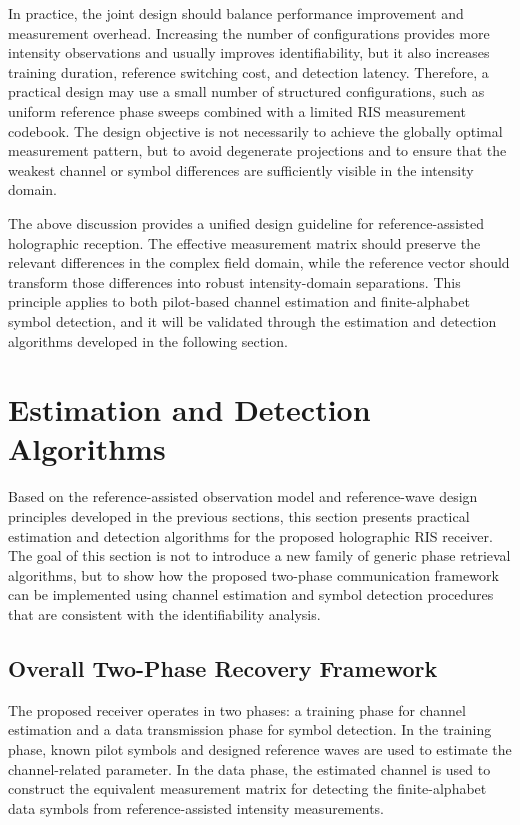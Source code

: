 \documentclass[journal]{IEEEtran}
\begin{document}
In practice, the joint design should balance performance improvement and measurement overhead. 
Increasing the number of configurations provides more intensity observations and usually improves identifiability, but it also increases training duration, reference switching cost, and detection latency. 
Therefore, a practical design may use a small number of structured configurations, such as uniform reference phase sweeps combined with a limited RIS measurement codebook. 
The design objective is not necessarily to achieve the globally optimal measurement pattern, but to avoid degenerate projections and to ensure that the weakest channel or symbol differences are sufficiently visible in the intensity domain.

The above discussion provides a unified design guideline for reference-assisted holographic reception. 
The effective measurement matrix should preserve the relevant differences in the complex field domain, while the reference vector should transform those differences into robust intensity-domain separations. 
This principle applies to both pilot-based channel estimation and finite-alphabet symbol detection, and it will be validated through the estimation and detection algorithms developed in the following section.

\section{Estimation and Detection Algorithms}

Based on the reference-assisted observation model and reference-wave design principles developed in the previous sections, this section presents practical estimation and detection algorithms for the proposed holographic RIS receiver. 
The goal of this section is not to introduce a new family of generic phase retrieval algorithms, but to show how the proposed two-phase communication framework can be implemented using channel estimation and symbol detection procedures that are consistent with the identifiability analysis.

\subsection{Overall Two-Phase Recovery Framework}

The proposed receiver operates in two phases: a training phase for channel estimation and a data transmission phase for symbol detection. 
In the training phase, known pilot symbols and designed reference waves are used to estimate the channel-related parameter. 
In the data phase, the estimated channel is used to construct the equivalent measurement matrix for detecting the finite-alphabet data symbols from reference-assisted intensity measurements.
\end{document}
